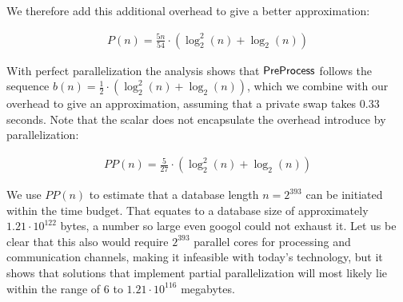 We therefore add this additional overhead to give a better approximation:

\begin{gather*}
    P(n) = \frac{5n}{54} \cdot \left( \log^2_2 \left( n \right) + \log_2 \left( n \right) \right)
\end{gather*}

With perfect parallelization the analysis shows that $ \mathsf{{PreProcess}} $ follows the sequence $ b(n) = \frac{1}{2} \cdot \left( \log^2_2 \left( n \right) + \log_2 \left( n \right) \right) $, which we combine with our overhead to give an approximation, assuming that a private swap takes 0.33 seconds. Note that the scalar does not encapsulate the overhead introduce by parallelization:

\begin{gather*}
    PP(n) = \frac{5}{27} \cdot \left( \log^2_2 \left( n \right) + \log_2 \left( n \right) \right)
\end{gather*}

We use $ PP(n) $ to estimate that a database length $ n = 2^{393} $ can be initiated within the time budget. That equates to a database size of approximately $ 1.21 \cdot 10^{122} $ bytes, a number so large even googol could not exhaust it. Let us be clear that this also would require $ 2^{393} $ parallel cores for processing and communication channels, making it infeasible with today's technology, but it shows that solutions that implement partial parallelization will most likely lie within the range of 6 to $ 1.21 \cdot 10^{116} $ megabytes.

